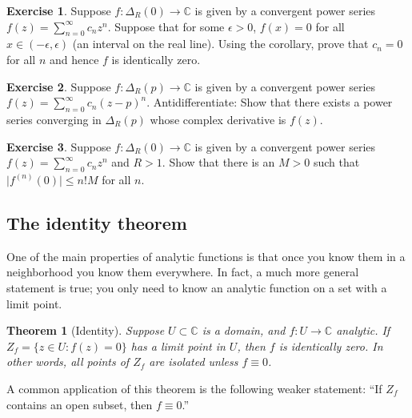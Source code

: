 \documentclass[12pt,openany]{book}
\newcommand{\sabs}[1]{\lvert {#1} \rvert}
\newcommand{\C}{{\mathbb{C}}}
\theoremstyle{plain}
\newtheorem{thm}{Theorem}[section]
\theoremstyle{remark}
\theoremstyle{definition}
\newenvironment{exbox}{%
    \def\FrameCommand{\vrule width 1pt \relax\hspace {10pt}}%
    \MakeFramed {\advance \hsize -\width \FrameRestore }%
}{%
    \endMakeFramed
}
\theoremstyle{exercise}
\newtheorem{exercise}{Exercise}[section]
\theoremstyle{example}
\begin{document}
\begin{exbox}
\begin{exercise}
Suppose $f \colon \Delta_R(0) \to \C$ is given by a convergent power
series
$f(z) = \sum_{n=0}^\infty c_n z^n$.
Suppose that for some $\epsilon > 0$, $f(x) = 0$ for all $x \in
(-\epsilon,\epsilon)$ (an interval on the real line).
Using the corollary,
prove that $c_n = 0$ for all $n$ and hence $f$ is identically zero.
\end{exercise}

\begin{exercise} \label{exercise:antiderseries}
Suppose $f \colon \Delta_R(p) \to \C$ is given by a convergent power
series
$f(z) = \sum_{n=0}^\infty c_n {(z-p)}^n$.
Antidifferentiate:
Show that there exists a power series converging in $\Delta_R(p)$
whose complex derivative is $f(z)$.
\end{exercise}

\begin{exercise} 
Suppose $f \colon \Delta_R(0) \to \C$ is given by a convergent power
series
$f(z) = \sum_{n=0}^\infty c_n {z}^n$ and $R > 1$.
Show that there is an $M>0$ such that
$\sabs{f^{(n)}(0)} \leq n! M$ for all $n$.
\end{exercise}
\end{exbox}

\subsection{The identity theorem}

One of the main properties of analytic functions is that once you know them
in a neighborhood you know them everywhere.  In fact, a much more general
statement is true; you only need to know an analytic function on a set with
a limit point.

\begin{thm}[Identity]
Suppose $U \subset \C$ is a domain, 
and $f \colon U \to \C$ analytic.
If $Z_f = \bigl\{ z \in U : f(z) = 0 \bigr\}$
has a limit point in $U$, then $f$ is identically zero.
In other words, all points of $Z_f$ are isolated unless $f \equiv 0$.
\end{thm}

A common application of this theorem is the following weaker statement: ``If $Z_f$
contains an open subset, then $f \equiv 0$.''
\end{document}
